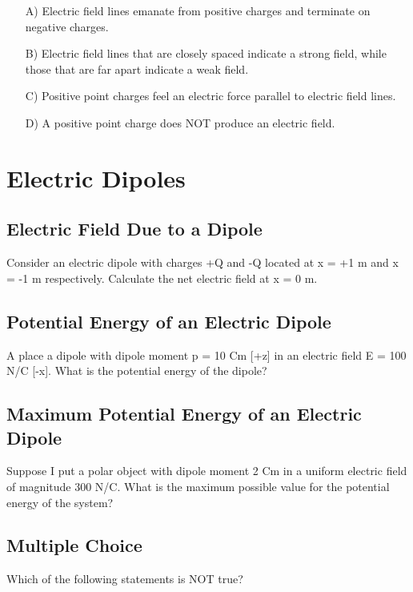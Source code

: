 \documentclass[11pt]{article}
\begin{document}
\begin{itemize}
	\item[A)] Electric field lines emanate from positive charges and terminate on negative charges.
	\item[B)] Electric field lines that are closely spaced indicate a strong field, while those that are far apart indicate a weak field.
	\item[C)] Positive point charges feel an electric force parallel to electric field lines.
	\item[D)] A positive point charge does NOT produce an electric field.
\end{itemize}


\pagebreak
\section{Electric Dipoles}

\subsection{Electric Field Due to a Dipole}
Consider an electric dipole with charges +Q and -Q located at x = +1 m and x = -1 m respectively.  Calculate the net electric field at x = 0 m.

\subsection{Potential Energy of an Electric Dipole}
A place a dipole with dipole moment p = 10 Cm [+z] in an electric field E = 100 N/C [-x].  What is the potential energy of the dipole?

\subsection{Maximum Potential Energy of an Electric Dipole}
Suppose I put a polar object with dipole moment 2 Cm in a uniform electric field of magnitude 300 N/C.  What is the maximum possible value for the potential energy of the system?

\subsection{Multiple Choice}
Which of the following statements is NOT true?
\end{document}
